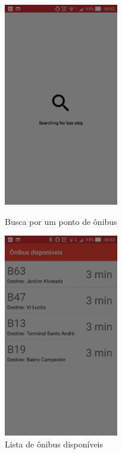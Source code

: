 \documentclass[
	12pt,				%
	oneside,			%
	a4paper,			%
	brazil				%
]{abntex2}
\begin{document}
{\begin{figure}[H]
\centering
\begin{minipage}{.5\textwidth}
  \centering
  \includegraphics[width=5cm]{images/beacon_searching_bus_stop}
  \caption{Busca por um ponto de ônibus}%
  \label{Rotulo}
\end{minipage}%
\begin{minipage}{.5\textwidth}
  \centering
  \includegraphics[width=5cm]{images/beacon_list_bus}
  \caption{Lista de ônibus disponíveis}%
  \label{Rotulo}
\end{minipage}
\end{figure}

}
\end{document}
